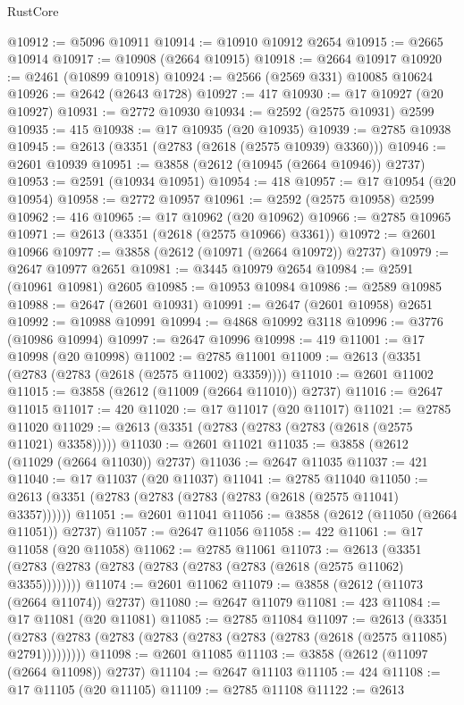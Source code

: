 \begin{lexlean}{RustCore}
\begin{coremodule}
@10912 := @5096 @10911
@10914 := @10910 @10912 @2654
@10915 := @2665 @10914
@10917 := @10908 (@2664 @10915)
@10918 := @2664 @10917
@10920 := @2461 (@10899 @10918)
@10924 := @2566 (@2569 @331) @10085 @10624
@10926 := @2642 (@2643 @1728)
@10927 := 417
@10930 := @17 @10927 (@20 @10927)
@10931 := @2772 @10930
@10934 := @2592 (@2575 @10931) @2599
@10935 := 415
@10938 := @17 @10935 (@20 @10935)
@10939 := @2785 @10938
@10945 := @2613 (@3351 (@2783 (@2618 (@2575 @10939) @3360)))
@10946 := @2601 @10939
@10951 := @3858 (@2612 (@10945 (@2664 @10946)) @2737)
@10953 := @2591 (@10934 @10951)
@10954 := 418
@10957 := @17 @10954 (@20 @10954)
@10958 := @2772 @10957
@10961 := @2592 (@2575 @10958) @2599
@10962 := 416
@10965 := @17 @10962 (@20 @10962)
@10966 := @2785 @10965
@10971 := @2613 (@3351 (@2618 (@2575 @10966) @3361))
@10972 := @2601 @10966
@10977 := @3858 (@2612 (@10971 (@2664 @10972)) @2737)
@10979 := @2647 @10977 @2651
@10981 := @3445 @10979 @2654
@10984 := @2591 (@10961 @10981) @2605
@10985 := @10953 @10984
@10986 := @2589 @10985
@10988 := @2647 (@2601 @10931)
@10991 := @2647 (@2601 @10958) @2651
@10992 := @10988 @10991
@10994 := @4868 @10992 @3118
@10996 := @3776 (@10986 @10994)
@10997 := @2647 @10996
@10998 := 419
@11001 := @17 @10998 (@20 @10998)
@11002 := @2785 @11001
@11009 := @2613 (@3351 (@2783 (@2783 (@2618 (@2575 @11002) @3359))))
@11010 := @2601 @11002
@11015 := @3858 (@2612 (@11009 (@2664 @11010)) @2737)
@11016 := @2647 @11015
@11017 := 420
@11020 := @17 @11017 (@20 @11017)
@11021 := @2785 @11020
@11029 := @2613 (@3351 (@2783 (@2783 (@2783 (@2618 (@2575 @11021) @3358)))))
@11030 := @2601 @11021
@11035 := @3858 (@2612 (@11029 (@2664 @11030)) @2737)
@11036 := @2647 @11035
@11037 := 421
@11040 := @17 @11037 (@20 @11037)
@11041 := @2785 @11040
@11050 := @2613 (@3351 (@2783 (@2783 (@2783 (@2783 (@2618 (@2575 @11041) @3357))))))
@11051 := @2601 @11041
@11056 := @3858 (@2612 (@11050 (@2664 @11051)) @2737)
@11057 := @2647 @11056
@11058 := 422
@11061 := @17 @11058 (@20 @11058)
@11062 := @2785 @11061
@11073 := @2613 (@3351 (@2783 (@2783 (@2783 (@2783 (@2783 (@2783 (@2618 (@2575 @11062) @3355))))))))
@11074 := @2601 @11062
@11079 := @3858 (@2612 (@11073 (@2664 @11074)) @2737)
@11080 := @2647 @11079
@11081 := 423
@11084 := @17 @11081 (@20 @11081)
@11085 := @2785 @11084
@11097 := @2613
    (@3351 (@2783 (@2783 (@2783 (@2783 (@2783 (@2783 (@2783 (@2618 (@2575 @11085) @2791)))))))))
@11098 := @2601 @11085
@11103 := @3858 (@2612 (@11097 (@2664 @11098)) @2737)
@11104 := @2647 @11103
@11105 := 424
@11108 := @17 @11105 (@20 @11105)
@11109 := @2785 @11108
@11122 := @2613

\end{coremodule}
\end{lexlean}

